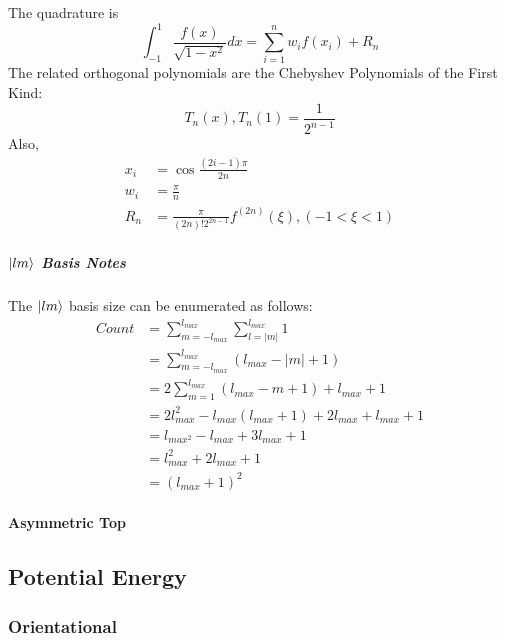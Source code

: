 \documentclass{revtex4-1}
\begin{document}
The quadrature is
\begin{equation}
\int_{-1}^{1}\frac{f(x)}{\sqrt{1-x^{2}}}dx = \sum_{i=1}^{n}w_{i}f(x_{i}) + R_{n}
\end{equation}
The related orthogonal polynomials are the Chebyshev Polynomials of the First Kind:
\begin{equation}
T_{n}(x),T_{n}(1)=\frac{1}{2^{n-1}}
\end{equation}
Also,
\begin{align}
x_{i} &= \cos{\frac{(2i-1)\pi}{2n}}\\
w_{i} &= \frac{\pi}{n}\\
R_{n} &= \frac{\pi}{(2n)!2^{2n-1}}f^{(2n)}(\xi), (-1<\xi<1)
\end{align}

\subparagraph{$\ket{lm}$ Basis Notes}\label{S:LegPolyRecursive}

The $\ket{lm}$ basis size can be enumerated as follows:
\begin{align}
Count  	&= \sum_{m=-l_{max}}^{l_{max}} \sum_{l=|m|}^{l_{max}}1 \\
		&= \sum_{m=-l_{max}}^{l_{max}} (l_{max} - |m| + 1) \nonumber \\
		&= 2 \sum_{m=1}^{l_{max}}(l_{max} - m + 1) + l_{max} + 1 \nonumber \\
		&= 2l_{max}^{2} - l_{max}(l_{max} + 1) + 2l_{max} + l_{max} + 1 \nonumber \\
		&= l_{max^{2}} - l_{max} + 3l_{max} + 1 \nonumber \\
		&= l_{max}^{2} + 2l_{max} + 1 \nonumber \\
		&= (l_{max} + 1)^{2}
\end{align}
												  
												  
\paragraph{Asymmetric Top}\label{S:AsRotBS} 

\subsection{Potential Energy}\label{S:PE}
\subsubsection{Orientational}\label{S:PEOri}
\end{document}
